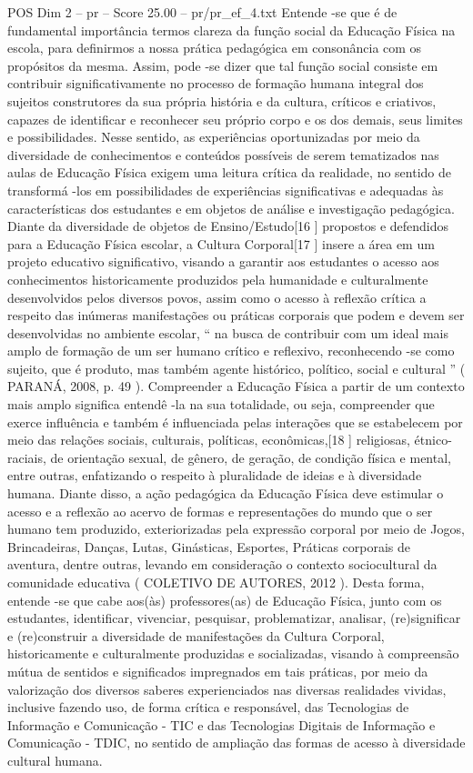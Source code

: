 \begin{textsample}{POS Dim 2 – pr – Score 25.00 – pr/pr\_ef\_4.txt}
Entende -se que é de fundamental importância termos clareza da função social da Educação Física na escola, para definirmos a nossa prática pedagógica em consonância com os propósitos da mesma.
Assim, pode -se dizer que tal função social consiste em contribuir significativamente no processo de formação humana integral dos sujeitos construtores da sua própria história e da cultura, críticos e criativos, capazes de identificar e reconhecer seu próprio corpo e os dos demais, seus limites e possibilidades.
Nesse sentido, as experiências oportunizadas por meio da diversidade de conhecimentos e conteúdos possíveis de serem tematizados nas aulas de Educação Física exigem uma leitura crítica da realidade, no sentido de transformá -los em possibilidades de experiências significativas e adequadas às características dos estudantes e em objetos de análise e investigação pedagógica.
Diante da diversidade de objetos de Ensino/Estudo[16 ] propostos e defendidos para a Educação Física escolar, a Cultura Corporal[17 ] insere a área em um projeto educativo significativo, visando a garantir aos estudantes o acesso aos conhecimentos historicamente produzidos pela humanidade e culturalmente desenvolvidos pelos diversos povos, assim como o acesso à reflexão crítica a respeito das inúmeras manifestações ou práticas corporais que podem e devem ser desenvolvidas no ambiente escolar, “ na busca de contribuir com um ideal mais amplo de formação de um ser humano crítico e reflexivo, reconhecendo -se como sujeito, que é produto, mas também agente histórico, político, social e cultural ” ( PARANÁ, 2008, p. 49 ).
Compreender a Educação Física a partir de um contexto mais amplo significa entendê -la na sua totalidade, ou seja, compreender que exerce influência e também é influenciada pelas interações que se estabelecem por meio das relações sociais, culturais, políticas, econômicas,[18 ] religiosas, étnico-raciais, de orientação sexual, de gênero, de geração, de condição física e mental, entre outras, enfatizando o respeito à pluralidade de ideias e à diversidade humana.
Diante disso, a ação pedagógica da Educação Física deve estimular o acesso e a reflexão ao acervo de formas e representações do mundo que o ser humano tem produzido, exteriorizadas pela expressão corporal por meio de Jogos, Brincadeiras, Danças, Lutas, Ginásticas, Esportes, Práticas corporais de aventura, dentre outras, levando em consideração o contexto sociocultural da comunidade educativa ( COLETIVO DE AUTORES, 2012 ).
Desta forma, entende -se que cabe aos(às) professores(as) de Educação Física, junto com os estudantes, identificar, vivenciar, pesquisar, problematizar, analisar, (re)significar e (re)construir a diversidade de manifestações da Cultura Corporal, historicamente e culturalmente produzidas e socializadas, visando à compreensão mútua de sentidos e significados impregnados em tais práticas, por meio da valorização dos diversos saberes experienciados nas diversas realidades vividas, inclusive fazendo uso, de forma crítica e responsável, das Tecnologias de Informação e Comunicação - TIC e das Tecnologias Digitais de Informação e Comunicação - TDIC, no sentido de ampliação das formas de acesso à diversidade cultural humana.

\end{textsample}
